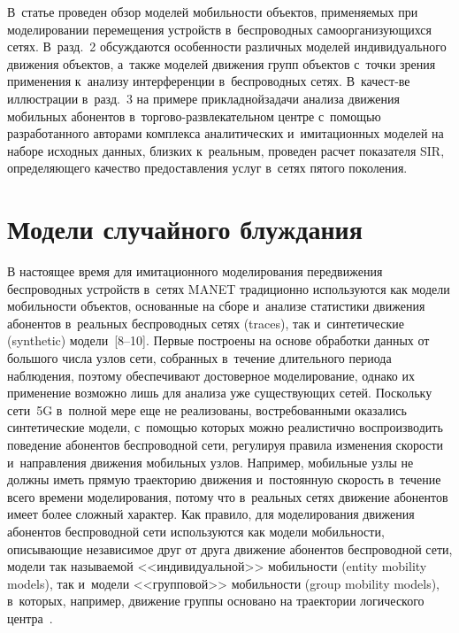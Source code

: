 \begin{multicols}{2}
В~статье проведен обзор моделей 
мо\-биль\-ности объектов, применяемых при моделировании перемещения 
устройств в~беспроводных самоорганизующихся сетях. В~разд.~2 
об\-суж\-да\-ют\-ся особенности различных моделей индивидуального движения 
объектов, а~также моделей движения\linebreak
 групп объектов с~точки зрения 
применения к~анализу интерференции в~беспроводных сетях. В~качест-\linebreak ве 
иллюстрации в~разд.~3 на примере прикладной\linebreak задачи анализа движения 
мобильных абонентов в~тор\-го\-во-раз\-вле\-ка\-тель\-ном центре с~по\-мощью 
разработанного авторами комплекса аналитических и~имитационных 
моделей на наборе исходных данных, близ\-ких к~реальным, проведен расчет 
показателя SIR, определяющего качество пред\-остав\-ле\-ния услуг в~сетях 
пятого поколения.

\vspace*{-8pt}

\section{Модели случайного блуждания}

\vspace*{-2pt}

  В настоящее время для имитационного моделирования передвижения 
беспроводных устройств в~сетях MANET традиционно используются как 
модели мо\-биль\-ности объектов, основанные на сборе и~анализе статистики 
движения абонентов в~реальных беспроводных сетях (traces), так 
и~синтетические (synthetic) модели~[8--10]. Первые построены на основе 
обработки данных от большого чис\-ла узлов сети, со\-бран\-ных в~течение 
длительного периода наблюдения, поэтому обеспечивают достоверное 
моделирование, однако их применение возможно лишь для анализа уже 
су\-ще\-ст\-ву\-ющих сетей. Поскольку сети~5G в~полной мере еще не 
реализованы, востребованными оказались синтетические модели, с~помощью 
которых мож\-но реалистично воспроизводить поведение абонентов 
беспроводной сети, регулируя правила изменения ско\-рости и~на\-прав\-ле\-ния 
движения мобильных узлов. Например, мобильные узлы не долж\-ны иметь 
прямую траекторию движения и~постоянную ско\-рость в~течение всего 
времени моделирования, потому что в~реальных сетях движение абонентов 
имеет более слож\-ный характер. Как правило, для моделирования движения 
абонентов беспроводной сети\linebreak
 используются как модели мо\-биль\-ности, 
опи\-сы\-ва\-ющие независимое друг от друга движение абонен\-тов беспроводной 
сети, модели так на\-зы\-ва\-емой <<индивидуальной>> мо\-биль\-ности (entity 
mobility models), так и~модели <<групповой>> мо\-биль\-ности (group mobility 
models), в~которых, например, движение группы основано на траектории 
логического цент\-ра~\cite{9-sg, 10-sg, 11-sg}.
  

\end{multicols}
